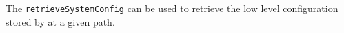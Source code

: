 The \verb+retrieveSystemConfig+ can be used to retrieve the low level configuration stored by \Rapture at a given path.
